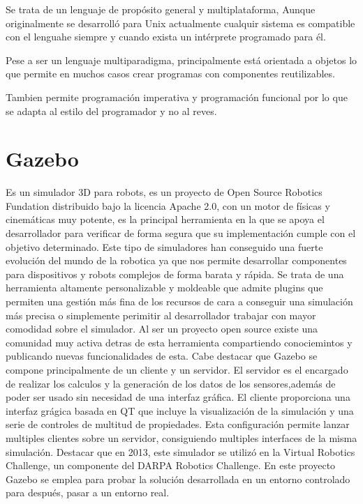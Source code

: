Se trata de un lenguaje de propósito general y multiplataforma, Aunque originalmente se desarrolló para Unix actualmente cualquir sistema es compatible con el lenguahe siempre y cuando exista un intérprete programado para él.

Pese a ser un lenguaje multiparadigma, principalmente está orientada a objetos lo que permite en muchos casos crear programas con componentes reutilizables. 

Tambien permite programación imperativa y programación funcional por lo que se adapta al estilo del programador y no al reves.

\section{Gazebo}
\label{sec:gazebo}
Es un simulador 3D para robots, es un proyecto de Open Source Robotics Fundation distribuido bajo la licencia Apache 2.0, con un motor de físicas y cinemáticas muy potente, es la principal herramienta en la que se apoya el desarrollador para verificar de forma segura que su implementación cumple con el objetivo determinado. Este tipo de simuladores han conseguido una fuerte evolución del mundo de la robotica ya que nos permite desarrollar componentes para dispositivos y robots complejos de forma barata y rápida.
Se trata de una herramienta altamente personalizable y moldeable que admite plugins que permiten una gestión más fina de los recursos de cara a conseguir una simulación más precisa o simplemente perimitir al desarrollador trabajar con mayor comodidad sobre el simulador.
Al ser un proyecto open source existe una comunidad muy activa detras de esta herramienta compartiendo conociemintos y publicando nuevas funcionalidades de esta.
Cabe destacar que Gazebo se compone principalmente de un cliente y un servidor. El
servidor es el encargado de realizar los calculos y la generación de los datos de los sensores,además de poder ser usado sin necesidad de una interfaz gráfica.
El cliente proporciona una interfaz grágica basada en QT que incluye la visualización de la simulación y una serie de controles de multitud de propiedades. Esta configuración permite lanzar multiples clientes sobre un servidor, consiguiendo multiples interfaces de la misma simulación.
Destacar que en 2013, este simulador se utilizó en la Virtual Robotics Challenge, un componente del DARPA Robotics Challenge.
En este proyecto Gazebo se emplea para probar la solución desarrollada en un entorno controlado para después, pasar a un entorno real.

